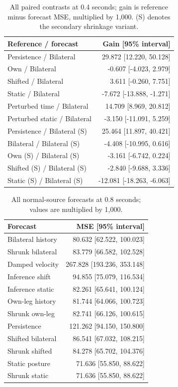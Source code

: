 \documentclass[letterpaper]{article}
\begin{document}
\begin{table}[t]
\centering
\small
\begin{tabular}{lr}
\toprule
Reference / forecast & Gain [95\% interval] \\
\midrule
Persistence / Bilateral & 29.872 [12.220, 50.128] \\
Own / Bilateral & -0.607 [-4.023, 2.979] \\
Shifted / Bilateral & 3.611 [-0.260, 7.751] \\
Static / Bilateral & -7.672 [-13.888, -1.271] \\
Perturbed time / Bilateral & 14.709 [8.969, 20.812] \\
Perturbed static / Bilateral & -3.150 [-11.091, 5.259] \\
Persistence / Bilateral (S) & 25.464 [11.897, 40.421] \\
Bilateral / Bilateral (S) & -4.408 [-10.995, 0.616] \\
Own (S) / Bilateral (S) & -3.161 [-6.742, 0.224] \\
Shifted (S) / Bilateral (S) & -2.840 [-9.688, 3.336] \\
Static (S) / Bilateral (S) & -12.081 [-18.263, -6.063] \\
\bottomrule
\end{tabular}
\caption{All paired contrasts at 0.4 seconds; gain is reference minus forecast MSE, multiplied by 1,000. (S) denotes the secondary shrinkage variant.}
\end{table}

\begin{table}[t]
\centering
\small
\begin{tabular}{lr}
\toprule
Forecast & MSE [95\% interval] \\
\midrule
Bilateral history & 80.632 [62.522, 100.023] \\
Shrunk bilateral & 83.779 [66.582, 102.528] \\
Damped velocity & 267.828 [193.236, 353.148] \\
Inference shift & 94.855 [75.079, 116.534] \\
Inference static & 82.261 [65.641, 100.124] \\
Own-leg history & 81.744 [64.066, 100.723] \\
Shrunk own-leg & 82.741 [66.126, 100.615] \\
Persistence & 121.262 [94.150, 150.800] \\
Shifted bilateral & 86.541 [67.032, 108.215] \\
Shrunk shifted & 84.278 [65.702, 104.376] \\
Static posture & 71.636 [55.850, 88.622] \\
Shrunk static & 71.636 [55.850, 88.622] \\
\bottomrule
\end{tabular}
\caption{All normal-source forecasts at 0.8 seconds; values are multiplied by 1,000.}
\end{table}
\end{document}
